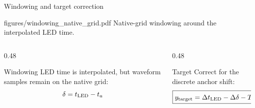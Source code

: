 \begin{frame}{Windowing and target correction}
\small

\begin{center}
\smartimage[0.96\textwidth]{0.52\textheight}
{figures/windowing_native_grid.pdf}
{Native-grid windowing around the interpolated LED time.}
\end{center}

\vspace{-0.45em}

\begin{columns}[T,totalwidth=\textwidth]

\begin{column}{0.48\textwidth}
\begin{block}{Windowing}
LED time is interpolated, but waveform samples remain on the native grid:
\large
\vspace{-0.5em}
\[
\delta=t_{\operatorname{LED}}-t_{a}
\]
\end{block}
\end{column}

\begin{column}{0.48\textwidth}
\begin{alertblock}{Target}
Correct for the discrete anchor shift:
\large
\[
\boxed{
y_{\mathrm{target}}
=
\Delta t_{\operatorname{LED}}
-
\Delta\delta
-
TOF
-\widehat C_{1,2}
}
\]
\end{alertblock}
\end{column}

\end{columns}

\end{frame}
